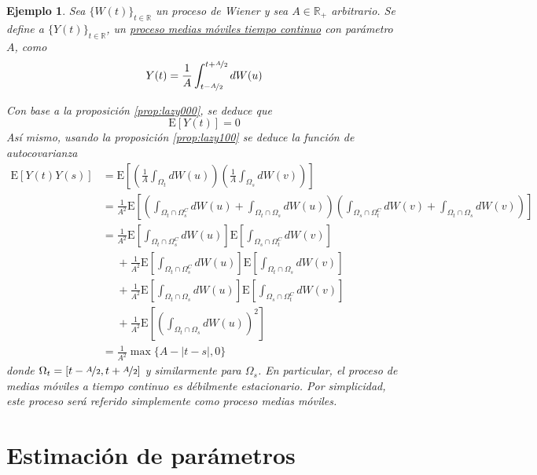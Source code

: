 \documentclass[12pt,letterpaper]{book}
\newtheorem{ejemplo}{Ejemplo}[chapter]
\newcommand{\R}{\mathbb{R}}
\newcommand{\E}[1]{\mathrm{E}\left[ #1 \right]}
\newcommand{\abso}[1]{\left| #1 \right|}
\newcommand{\pheq}{\phantom{=}}
\begin{document}
\begin{ejemplo}
Sea $\{ W(t)\}_{t\in\R}$ un proceso de Wiener y sea $A\in\R_+$ arbitrario. Se define a $\{Y(t)\}_{t\in\R}$, un \underline{proceso medias m\'oviles tiempo continuo} con parámetro $A$, como
\begin{equation}
Y(t) = \frac{1}{A}\int_{t-\nicefrac{A}{2}}^{t+\nicefrac{A}{2}} dW(u)
\end{equation}

Con base a la proposición \ref{prop:lazy000}, se deduce que
\begin{equation}
\E{Y(t)} = 0
\end{equation}
Así mismo, usando la proposición \ref{prop:lazy100} se deduce la función de autocovarianza
\begin{align*}
\E{Y(t)Y(s)} &= 
\E{ \left( \frac{1}{A}\int_{\Omega_t} dW(u) \right) \left( \frac{1}{A}\int_{\Omega_s} dW(v)\right) } \\
&= 
\frac{1}{A^2} 
\E{ 
\left( 
\int_{\Omega_t \cap \Omega_s^C} dW(u) + \int_{\Omega_t \cap \Omega_s} dW(u) 
\right)
\left( 
\int_{\Omega_s \cap \Omega_t^C} dW(v) + \int_{\Omega_t \cap \Omega_s} dW(v) 
\right)  
} \\
&=
\frac{1}{A^2} 
\E{  
\int_{\Omega_t \cap \Omega_s^C} dW(u)  
}
\E{
\int_{\Omega_s \cap \Omega_t^C} dW(v) 
} \\
&\pheq
+ \frac{1}{A^2} 
\E{ 
\int_{\Omega_t \cap \Omega_s^C} dW(u)  
}
\E{
 \int_{\Omega_t \cap \Omega_s} dW(v) 
} \\
&\pheq
+\frac{1}{A^2} 
\E{ 
\int_{\Omega_t \cap \Omega_s} dW(u) 
}
\E{
\int_{\Omega_s \cap \Omega_t^C} dW(v)
} \\
&\pheq
+\frac{1}{A^2} 
\E{ 
\left( 
\int_{\Omega_t \cap \Omega_s} dW(u) 
\right)^2
} \\
&= \frac{1}{A^2} \max \{ A-\abso{t-s}, 0 \}
\end{align*}
donde $\Omega_t = \left[ t - \nicefrac{A}{2}, t + \nicefrac{A}{2} \right]$ y similarmente para $\Omega_s$.
%
En particular, el proceso de medias móviles a tiempo continuo es débilmente estacionario.
%
Por simplicidad, este proceso será referido simplemente como \textit{proceso medias móviles}.
\end{ejemplo}


\section{Estimación de parámetros}
\end{document}
